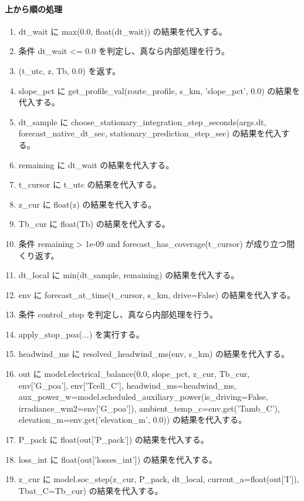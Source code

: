 \documentclass[a4paper,11pt]{article}
\begin{document}
            \paragraph{上から順の処理}
            \begin{enumerate}[leftmargin=1.8em]
            \item dt\_wait に max(0.0, float(dt\_wait)) の結果を代入する。
\item 条件 dt\_wait <= 0.0 を判定し、真なら内部処理を行う。
\item   (t\_utc, z, Tb, 0.0) を返す。
\item slope\_pct に get\_profile\_val(route\_profile, s\_km, 'slope\_pct', 0.0) の結果を代入する。
\item dt\_sample に choose\_stationary\_integration\_step\_seconds(args.dt, forecast\_native\_dt\_sec, stationary\_prediction\_step\_sec) の結果を代入する。
\item remaining に dt\_wait の結果を代入する。
\item t\_cursor に t\_utc の結果を代入する。
\item z\_cur に float(z) の結果を代入する。
\item Tb\_cur に float(Tb) の結果を代入する。
\item 条件 remaining > 1e-09 and forecast\_has\_coverage(t\_cursor) が成り立つ間くり返す。
\item   dt\_local に min(dt\_sample, remaining) の結果を代入する。
\item   env に forecast\_at\_time(t\_cursor, s\_km, drive=False) の結果を代入する。
\item   条件 control\_stop を判定し、真なら内部処理を行う。
\item     apply\_stop\_poa(...) を実行する。
\item   headwind\_ms に resolved\_headwind\_ms(env, s\_km) の結果を代入する。
\item   out に model.electrical\_balance(0.0, slope\_pct, z\_cur, Tb\_cur, env['G\_poa'], env['Tcell\_C'], headwind\_ms=headwind\_ms, aux\_power\_w=model.scheduled\_auxiliary\_power(is\_driving=False, irradiance\_wm2=env['G\_poa']), ambient\_temp\_c=env.get('Tamb\_C'), elevation\_m=env.get('elevation\_m', 0.0)) の結果を代入する。
\item   P\_pack に float(out['P\_pack']) の結果を代入する。
\item   loss\_int に float(out['losses\_int']) の結果を代入する。
\item   z\_cur に model.soc\_step(z\_cur, P\_pack, dt\_local, current\_a=float(out['I']), Tbat\_C=Tb\_cur) の結果を代入する。

\end{enumerate}
\end{document}
